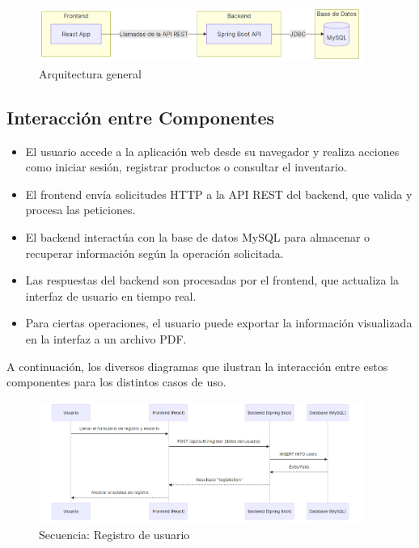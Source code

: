 \begin{figure}[H]
    \centering
    \includegraphics[width=0.95\textwidth]{diagrams/architecture}
    \caption{Arquitectura general}
\end{figure}

\subsection{Interacción entre Componentes}

\begin{itemize}
    \item El usuario accede a la aplicación web desde su navegador y realiza acciones como iniciar sesión, registrar productos o consultar el inventario.
    \item El frontend envía solicitudes HTTP a la API REST del backend, que valida y procesa las peticiones.
    \item El backend interactúa con la base de datos MySQL para almacenar o recuperar información según la operación solicitada.
    \item Las respuestas del backend son procesadas por el frontend, que actualiza la interfaz de usuario en tiempo real.
    \item Para ciertas operaciones, el usuario puede exportar la información visualizada en la interfaz a un archivo PDF.
\end{itemize}

A continuación, los diversos diagramas que ilustran la interacción entre estos componentes para los distintos casos de uso.

\begin{figure}[H]
    \centering
    \includegraphics[width=0.95\textwidth]{diagrams/sequence/register}
    \caption{Secuencia: Registro de usuario}
\end{figure}

